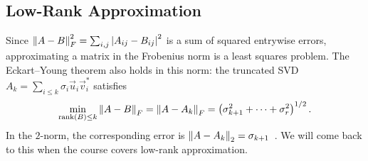 \subsection{Low-Rank Approximation}

Since $\left\lVert A - B \right\rVert_F^2 = \sum_{i,j}\left\lvert A_{ij} - B_{ij} \right\rvert^2$ is a sum of squared entrywise errors, approximating a matrix in the Frobenius norm is a least squares problem. The Eckart--Young theorem also holds in this norm: the truncated SVD $A_k = \sum_{i \le k}\sigma_i\vec{u}_i\vec{v}_i^\ast$ satisfies
\begin{equation}
  \min_{\operatorname{rank}(B) \le k}\left\lVert A - B \right\rVert_F = \left\lVert A - A_k \right\rVert_F = \left(\sigma_{k+1}^2 + \cdots + \sigma_r^2\right)^{1/2}.
\end{equation}
In the $2$-norm, the corresponding error is $\left\lVert A - A_k \right\rVert_2 = \sigma_{k+1}$~\cite[\S3.2.3]{Demmel}. We will come back to this when the course covers low-rank approximation.

